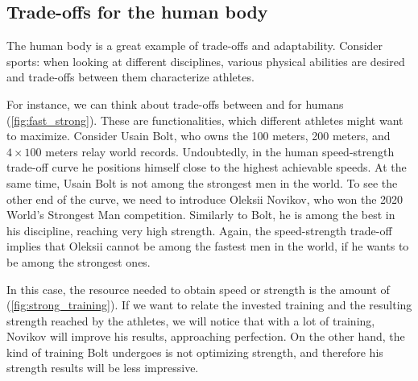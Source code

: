 \vfill
\clearpage

\subsection{Trade-offs for the human body}

\begin{marginfigure}
    \centering
    \caption{}
    \label{fig:fast_strong}
\end{marginfigure}

The human body is a great example of trade-offs and adaptability.
Consider sports: when looking at different disciplines, various physical abilities are desired and trade-offs between them characterize athletes.

For instance, we can think about trade-offs between  and  for humans (\cref{fig:fast_strong}).
These are functionalities, which different athletes might want to maximize.
Consider Usain Bolt, who owns the 100 meters, 200 meters, and~$4\times 100$ meters relay world records.
Undoubtedly, in the human speed-strength trade-off curve he positions himself close to the highest achievable speeds.
At the same time, Usain Bolt is not among the strongest men in the world.
To see the other end of the curve, we need to introduce Oleksii Novikov, who won the 2020 World's Strongest Man competition.
Similarly to Bolt, he is among the best in his discipline, reaching very high strength.
Again, the speed-strength trade-off implies that Oleksii cannot be among the fastest men in the world, if he wants to be among the strongest ones.

\begin{marginfigure}
    \centering
    \caption{}
    \label{fig:strong_training}
\end{marginfigure}

In this case, the resource needed to obtain speed or strength is the amount of  (\cref{fig:strong_training}).
If we want to relate the invested training and the resulting strength reached by the athletes, we will notice that with a lot of training, Novikov will improve his results, approaching perfection.
On the other hand, the kind of training Bolt undergoes is not optimizing strength, and therefore his strength results will be less impressive.


